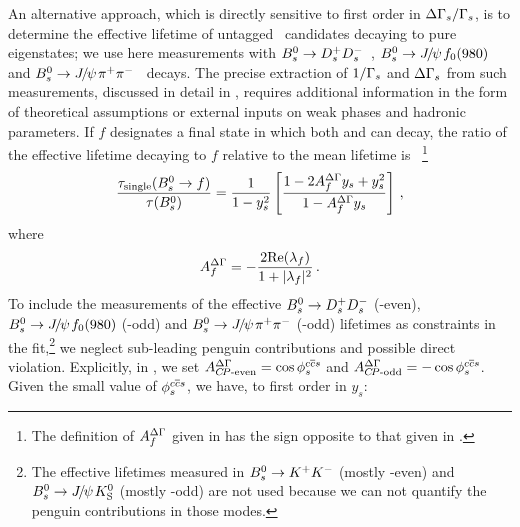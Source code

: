 An alternative approach, which is directly sensitive to first order in 
$\Delta\Gamma_{s}/\Gamma_{s}$, 
is to determine the effective lifetime of untagged \Bs\ candidates
decaying to %
pure \CP eigenstates; we use here measurements with
$B^0_s \to D_s^+D_s^-$~\cite{Aaij:2013bvd}, 
$B^0_s \to {J\mskip -3mu/\mskip -2mu\psi\mskip 2mu} f_0(980)$~\cite{Aaltonen:2011nk}
and $B^0_s\to {J\mskip -3mu/\mskip -2mu\psi\mskip 2mu} \pi^+\pi^-$~\cite{Aaij:2013oba,*LHCb:2011aa_mod,*LHCb:2012ad_mod,*LHCb:2011ab_mod,*Aaij:2012nta_mod} decays.
The precise extraction of $1/\Gamma_{s}$ and $\Delta\Gamma_{s}$
from such measurements, discussed in detail in , 
requires additional information 
in the form of theoretical assumptions or
external inputs on weak phases and hadronic parameters. 
If $f$ designates a final state in which both \Bs and \Bsbar can decay,
the ratio of the effective \Bs lifetime decaying to $f$ relative to the mean
\Bs lifetime is~\cite{Fleischer:2011cw}%
\footnote{%
\label{foot:life_mix:ADG-def}
The definition of $A_f^{\Delta\Gamma}$ given in  has the sign opposite to that given in .}
\begin{equation}
  \frac{\tau_{\rm single}(\Bs \to f)}{\tau(\Bs)} = \frac{1}{1-y_s^2} \left[ \frac{1 - 2A_f^{\DG} y_s + y_s^2}{1 - A_f^{\DG} y_s}\right ] \,,
\labe{tauf_fleisch}
\end{equation}
where
\begin{equation}
A_f^{\DG} = -\frac{2 \Re(\lambda_f)} {1+|\lambda_f|^2} \,.
\labe{ADG}
\end{equation}
To include the measurements of the effective
$B^0_s \to D_s^+D_s^-$ (\CP-even), $B^0_s \to {J\mskip -3mu/\mskip -2mu\psi\mskip 2mu} f_0(980)$ (\CP-odd) and
$B^0_s \to {J\mskip -3mu/\mskip -2mu\psi\mskip 2mu}\pi^+\pi^-$ (\CP-odd) 
lifetimes as constraints in the \DGs fit,\footnote{%
The effective lifetimes measured in $B^0_s\to K^+ K^-$ (mostly \CP-even) and  $B^0_s \to {J\mskip -3mu/\mskip -2mu\psi\mskip 2mu} K_{\rm S}^0$ (mostly \CP-odd) are not used because we can not quantify the penguin contributions in those modes.}
we neglect sub-leading penguin contributions and possible direct \CP violation. 
Explicitly, in , we set
$A_{\mbox{\scriptsize \CP-even}}^{\DG} = \cos \phiccbars$
and $A_{\mbox{\scriptsize \CP-odd}}^{\DG} = -\cos \phiccbars$.
Given the small value of $\phiccbars$, we have, to first order in $y_s$:
